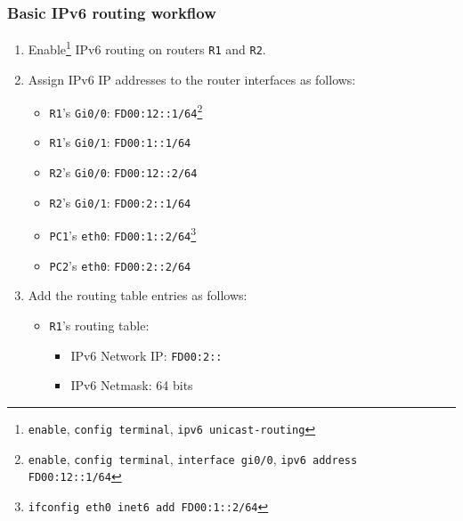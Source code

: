 \documentclass[pdftex,12pt,a4paper]{article}
\begin{document}
            \subsubsection{Basic IPv6 routing workflow}
                \begin{enumerate}
                    \item Enable\footnote{\texttt{enable}, \texttt{config
                        terminal}, \texttt{ipv6 unicast-routing}} IPv6 routing on routers \texttt{R1} and
                        \texttt{R2}.
                    \item Assign IPv6 IP addresses to the router interfaces as
                        follows:
                        \begin{itemize}
                            \item \texttt{R1}'s \texttt{Gi0/0}:
                                \texttt{FD00:12::1/64}\footnote{\texttt{enable},
                                    \texttt{config terminal}, \texttt{interface
                                gi0/0}, \texttt{ipv6 address FD00:12::1/64}}
                            \item \texttt{R1}'s \texttt{Gi0/1}:
                                \texttt{FD00:1::1/64}
                            \item \texttt{R2}'s \texttt{Gi0/0}:
                                \texttt{FD00:12::2/64}
                            \item \texttt{R2}'s \texttt{Gi0/1}: 
                                \texttt{FD00:2::1/64}
                            \item \texttt{PC1}'s \texttt{eth0}: 
                                \texttt{FD00:1::2/64}\footnote{\texttt{ifconfig eth0 inet6
                                add FD00:1::2/64}}
                            \item \texttt{PC2}'s \texttt{eth0}: 
                                \texttt{FD00:2::2/64}
                        \end{itemize}
                    \item Add the routing table entries as follows:
                        \begin{itemize}
                            \item \texttt{R1}'s routing table:
                                \begin{itemize}
                                    \item IPv6 Network IP: \texttt{FD00:2::}
                                    \item IPv6 Netmask: 64 bits

\end{itemize}
\end{itemize}
\end{enumerate}
\end{document}
